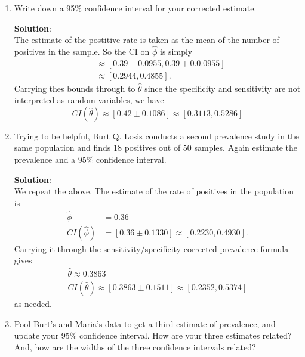 \documentclass[11pt]{article}
\begin{document}
\begin{enumerate}
\begin{enumerate}[label=\alph*.]
	\item Write down a 95\% confidence interval for your corrected estimate. 
	
	\begin{tcolorbox}[breakable]
		\textbf{Solution}:\\
		The estimate of the postitive rate is taken as the mean of the number of positives in the sample. So the CI on $\hat{\phi}$ is simply
		\begin{align*}
			[\hat{\phi}-0.96\sqrt{\frac{\hat{\phi}(1-\hat{\phi})}{N}}, \hat{\phi}-0.96\sqrt{\frac{\hat{\phi}(1-\hat{\phi})}{N}}] &\approx [0.39-0.0955, 0.39+0.0.0955]\\
			&\approx[0.2944, 0.4855].
		\end{align*}
		Carrying thes bounds through to $\hat{\theta}$ since the specificity and sensitivity are not interpreted as random variables, we have
		\begin{equation*}
			CI(\hat{\theta})\approx [0.42\pm 0.1086] \approx [0.3113,0.5286]
		\end{equation*}
	\end{tcolorbox}
	
	\item Trying to be helpful, Burt Q. Losis conducts a second prevalence study in the same population and finds 18 positives out of 50 samples. Again estimate the prevalence and a 95\% confidence interval.
	
	\begin{tcolorbox}[breakable]
		\textbf{Solution}:\\
		We repeat the above. The estimate of the rate of positives in the population is 
		\begin{align*}
			\hat{\phi} &= 0.36\\
			CI(\hat{\phi})&=[0.36\pm 0.1330]\approx[0.2230, 0.4930].
		\end{align*}
		Carrying it through the sensitivity/specificity corrected prevalence formula gives
		\begin{align*}
			\hat{\theta}\approx 0.3863\\
			CI(\hat{\theta})\approx [0.3863\pm 0.1511]\approx [0.2352, 0.5374]
		\end{align*}
		as needed.
		
	\end{tcolorbox}
	
	\item Pool Burt's and Maria's data to get a third estimate of prevalence, and update your 95\% confidence interval. How are your three estimates related? And, how are the widths of the three confidence intervals related? 
	

\end{enumerate}
\end{enumerate}
\end{document}

